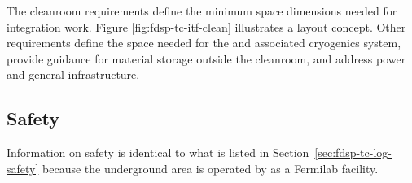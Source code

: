 \label{sec:fdsp-tc-itf-req}

The cleanroom requirements define the minimum space dimensions needed for integration work.  %
Figure \ref{fig:fdsp-tc-itf-clean} illustrates a layout concept. Other requirements define the space needed for the \coldbox and  associated cryogenics system, provide guidance for material storage outside the cleanroom, and address  power and general infrastructure. 
 
\subsection{Safety}
\label{sec:fdsp-tc-itf-safety}

Information on  safety is identical to what is listed in Section~\ref{sec:fdsp-tc-log-safety} because the underground area %
is operated by  as a Fermilab facility.    %

